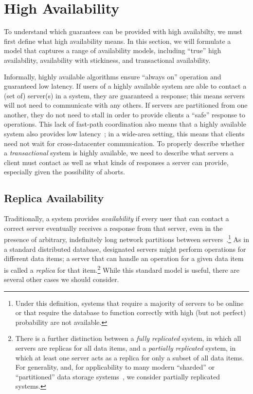 
\section{High Availability}
\label{sec:availability}

To understand which guarantees can be provided with high availabilty,
we must first define what high availability means. In this section, we
will formulate a model that captures a range of availability models,
including ``true'' high availability, availability with stickiness,
and transactional availability.

Informally, highly available algorithms ensure ``always on'' operation
and guaranteed low latency. If users of a highly available system are
able to contact a (set of) server(s) in a system, they are guaranteed
a response; this means servers will not need to communicate with any
others. If servers are partitioned from one another, they do not need
to stall in order to provide clients a ``safe'' response to
operations. This lack of fast-path coordination also means that a
highly available system also provides low latency~\cite{abadi-pacelc};
in a wide-area setting, this means that clients need not wait for
cross-datacenter communication. To properly describe whether a
\textit{transactional} system is highly available, we need to describe
what servers a client must contact as well as what kinds of responses
a server can provide, especially given the possibility of aborts.

\subsection{Replica Availability}

Traditionally, a system provides {\em availability} if every user that
can contact a correct server eventually receives a response from that
server, even in the presence of arbitrary, indefinitely long network
partitions between servers~\cite{gilbert-cap}.\footnote{Under this
  definition, systems that require a majority of servers to be online
  or that require the database to function correctly with high (but
  not perfect) probability are not available.} As in a standard
distributed database, designated servers might perform operations for
different data items; a server that can handle an operation for a
given data item is called a \textit{replica} for that
item.\footnote{There is a further distinction between a \textit{fully
    replicated} system, in which all servers are replicas for all data
  items, and a \textit{partially replicated} system, in which at least
  one server acts as a replica for only a subset of all data
  items. For generality, and, for applicability to many modern
  ``sharded'' or ``partitioned'' data storage systems~\cite{dynamo,
    pnuts, bigtable, spanner, hstore}, we consider partially
  replicated systems.} While this standard model is useful, there are
several other cases we should consider.

